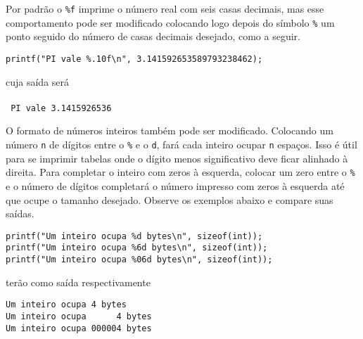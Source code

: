 \documentclass{book}
\begin{document}
Por padrão o {\tt \%f} imprime o número real com seis casas decimais, mas esse comportamento pode ser modificado colocando logo depois do símbolo {\tt \%} um ponto seguido do número de casas decimais desejado, como a seguir.

\begin{lstlisting}
printf("PI vale %.10f\n", 3.141592653589793238462);
\end{lstlisting}

cuja saída será\\
\\
{\tt
PI vale 3.1415926536\\
}

O formato de números inteiros também pode ser modificado. Colocando um número {\tt n} de dígitos entre o {\tt \%} e o {\tt d}, fará cada inteiro ocupar {\tt n} espaços. Isso é útil para se imprimir tabelas onde o dígito menos significativo deve ficar alinhado à direita. Para completar o inteiro com zeros à esquerda, colocar um zero entre o {\tt \%} e o número de dígitos completará o número impresso com zeros à esquerda até que ocupe o tamanho desejado. Observe os exemplos abaixo e compare suas saídas.

\pagebreak

\begin{lstlisting}
printf("Um inteiro ocupa %d bytes\n", sizeof(int));
printf("Um inteiro ocupa %6d bytes\n", sizeof(int));
printf("Um inteiro ocupa %06d bytes\n", sizeof(int));
\end{lstlisting}

terão como saída respectivamente

\begin{verbatim}
Um inteiro ocupa 4 bytes
Um inteiro ocupa      4 bytes
Um inteiro ocupa 000004 bytes
\end{verbatim}
\end{document}
